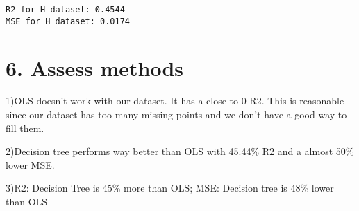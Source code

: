 \documentclass[11pt]{article}
\begin{document}
    \begin{Verbatim}[commandchars=\\\{\}]
R2 for H dataset: 0.4544 
MSE for H dataset: 0.0174 

    \end{Verbatim}

    \section{6. Assess methods}\label{assess-methods}

    1)OLS doesn't work with our dataset. It has a close to 0 R2. This is
reasonable since our dataset has too many missing points and we don't
have a good way to fill them.

2)Decision tree performs way better than OLS with 45.44\% R2 and a
almost 50\% lower MSE.

3)R2: Decision Tree is 45\% more than OLS; MSE: Decision tree is 48\%
lower than OLS


    
    
    
    
\end{document}
